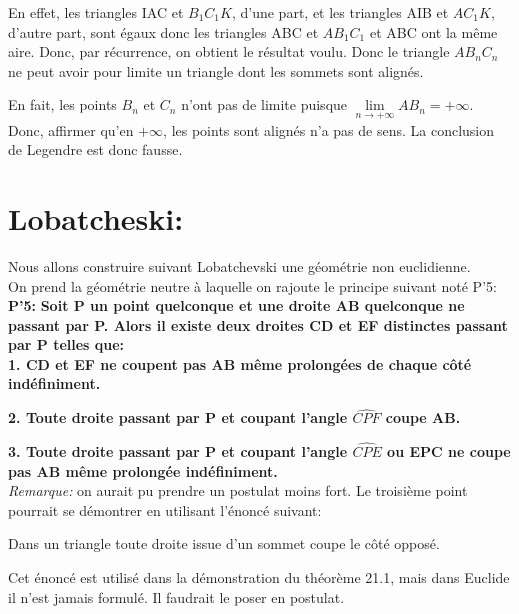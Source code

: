 \documentclass[a4paper, 12pt, twoside]{book}
\begin{document}
 En effet, les triangles IAC et $B_{1}C_{1}K$, d'une part, et les triangles AIB et $AC_{1}K$, d'autre part, sont égaux donc les triangles ABC et $AB_{1}C_{1}$ et ABC ont la même aire. Donc, par récurrence, on obtient le résultat voulu. Donc le triangle $AB_{n}C_{n}$ ne peut avoir pour limite un triangle dont les sommets sont alignés.\
 
  En fait, les points $B_{n}$ et $C_{n}$ n'ont pas de limite puisque $\lim\limits_{n\rightarrow +\infty }AB_{n}=+\infty$. Donc, affirmer qu'en $+\infty$, les points sont alignés n'a pas de sens. La conclusion de Legendre est donc fausse.\\
  
 \chapter{Lobatcheski:}
         
  Nous allons construire suivant Lobatchevski une géométrie non euclidienne.\\
  
  On prend la géométrie neutre à laquelle on rajoute le principe suivant noté P'5:\\
  
  \textbf{P'5:} \textbf{Soit P un point quelconque et une droite AB quelconque ne passant par P. Alors il existe deux droites CD et EF distinctes passant par P telles que:}\\
  
  
  
 \textbf{1. CD et EF ne coupent pas AB même prolongées de chaque côté indéfiniment.}\
  
  \textbf{2. Toute droite passant par P et coupant l'angle $\hat{CPF}$ coupe AB.}\
  
 \textbf{3. Toute droite passant par P et coupant l'angle $\hat{CPE}$ ou EPC ne coupe pas AB même prolongée indéfiniment.}\\
  
  
  
  
  
  \textit{Remarque:} on aurait pu prendre un postulat moins fort. Le troisième point pourrait se démontrer en utilisant l'énoncé suivant:\
  
  Dans un triangle toute droite issue d'un sommet coupe le côté opposé.\
  
  Cet énoncé est utilisé dans la démonstration du théorème 21.1, mais dans Euclide il n'est jamais formulé. Il faudrait le poser en postulat.\\
  
\end{document}
